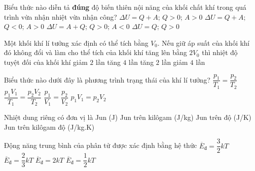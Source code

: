 	\begin{ex}%
		Biểu thức nào diễn tả \textbf{đúng} độ biến thiên nội năng của khối chất khí trong quá trình vừa nhận nhiệt vừa nhận công?
		\choice
		{\True $\Delta U=Q+A$; $Q>0$; $A>0$}
		{$\Delta U=Q+A$; $Q<0$; $A>0$}
		{$\Delta U=A+Q$; $Q>0$; $A<0$}
		{$\Delta U=Q$; $Q>0$}
	\end{ex}

	\begin{ex}%
		Một khối khí lí tưởng xác định có thể tích bằng $V_0$. Nếu giữ áp suất của khối khí đó không đổi và làm cho thể tích của khối khí tăng lên bằng $2V_0$ thì nhiệt độ tuyệt đối của khối khí
		\choice
		{giảm $2$ lần}
		{tăng $4$ lần}
		{\True tăng $2$ lần}
		{giảm $4$ lần}
	\end{ex}

	\begin{ex}%
		Biểu thức nào dưới đây là phương trình trạng thái của khí lí tưởng?
		\choice
		{$\dfrac{p_1}{T_1}=\dfrac{p_2}{T_2}$}
		{\True $\dfrac{p_1V_1}{T_1}=\dfrac{p_2V_2}{T_2}$}
		{$\dfrac{p_1}{V_1}=\dfrac{p_2}{V_2}$}
		{$p_1V_1=p_2V_2$}
	\end{ex}

	\begin{ex}%
		Nhiệt dung riêng có đơn vị là
		\choice
		{Jun (J)}
		{Jun trên kilôgam (J/kg)}
		{Jun trên độ (J/K)}
		{\True Jun trên kilôgam độ (J/kg.K)}
	\end{ex}

	\begin{ex}%
		Động năng trung bình của phân tử được xác định bằng hệ thức
		\choice
		{\True $\overline{E}_{\text{đ}}=\dfrac{3}{2}kT$}
		{$\overline{E}_{\text{đ}}=\dfrac{2}{3}kT$}
		{$\overline{E}_{\text{đ}}=2kT$}
		{$\overline{E}_{\text{đ}}=\dfrac{1}{2}kT$}
	\end{ex}

